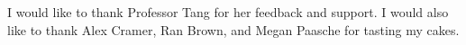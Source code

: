 I would like to thank Professor Tang for her feedback and support.
I would also like to thank Alex Cramer, Ran Brown, and Megan Paasche for tasting my cakes.
